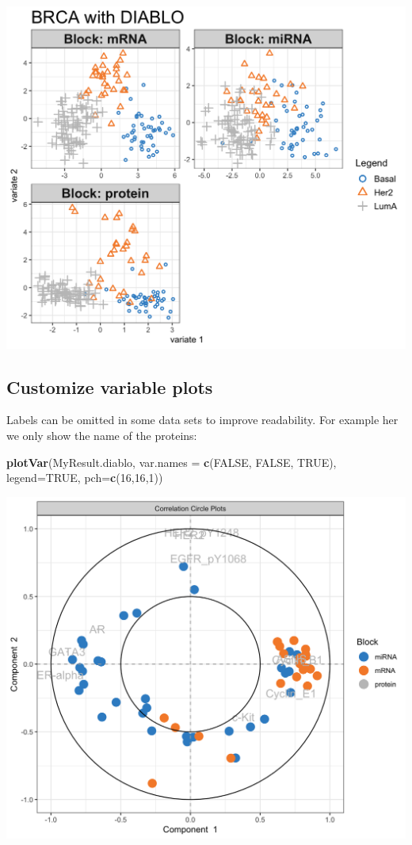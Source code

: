 \documentclass[]{book}
\newenvironment{Shaded}{\begin{snugshade}}{\end{snugshade}}
\newcommand{\KeywordTok}[1]{\textcolor[rgb]{0.13,0.29,0.53}{\textbf{#1}}}
\newcommand{\DataTypeTok}[1]{\textcolor[rgb]{0.13,0.29,0.53}{#1}}
\newcommand{\DecValTok}[1]{\textcolor[rgb]{0.00,0.00,0.81}{#1}}
\newcommand{\OtherTok}[1]{\textcolor[rgb]{0.56,0.35,0.01}{#1}}
\newcommand{\NormalTok}[1]{#1}
\theoremstyle{definition}
\theoremstyle{definition}
\theoremstyle{definition}
\theoremstyle{remark}
\begin{document}
\begin{center}\includegraphics[width=0.5\linewidth]{Figures/unnamed-chunk-4-1} \end{center}

\subsection{Customize variable plots}\label{diablo:plotVar}

Labels can be omitted in some data sets to improve readability. For
example her we only show the name of the proteins:

\begin{Shaded}
\begin{Highlighting}[]
\KeywordTok{plotVar}\NormalTok{(MyResult.diablo, }\DataTypeTok{var.names =} \KeywordTok{c}\NormalTok{(}\OtherTok{FALSE}\NormalTok{, }\OtherTok{FALSE}\NormalTok{, }\OtherTok{TRUE}\NormalTok{),}
        \DataTypeTok{legend=}\OtherTok{TRUE}\NormalTok{, }\DataTypeTok{pch=}\KeywordTok{c}\NormalTok{(}\DecValTok{16}\NormalTok{,}\DecValTok{16}\NormalTok{,}\DecValTok{1}\NormalTok{))}
\end{Highlighting}
\end{Shaded}

\begin{center}\includegraphics[width=0.5\linewidth]{Figures/unnamed-chunk-5-1} \end{center}
\end{document}
